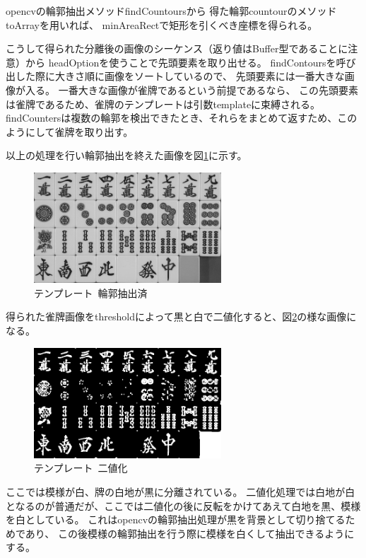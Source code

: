 \documentclass{jsarticle}
\begin{document}
\begin{multicols}{2}
opencvの輪郭抽出メソッドfindCountoursから
得た輪郭countourのメソッドtoArrayを用いれば、
minAreaRectで矩形を引くべき座標を得られる。

こうして得られた分離後の画像のシーケンス（返り値はBuffer型であることに注意）から
headOptionを使うことで先頭要素を取り出せる。
findContoursを呼び出した際に大きさ順に画像をソートしているので、
先頭要素には一番大きな画像が入る。
一番大きな画像が雀牌であるという前提であるなら、
この先頭要素は雀牌であるため、雀牌のテンプレートは引数templateに束縛される。
findCountersは複数の輪郭を検出できたとき、それらをまとめて返すため、このようにして雀牌を取り出す。

以上の処理を行い輪郭抽出を終えた画像を図\ref{fig:templateCrop}に示す。

\begin{figure}[H]
  \begin{center}
    \includegraphics[clip,width=7.0cm]{./img/template_crop.png}
    \caption{テンプレート\ 輪郭抽出済}
    \label{fig:templateCrop}
  \end{center}
\end{figure}

得られた雀牌画像をthresholdによって黒と白で二値化すると、図\ref{fig:templateBinary}の様な画像になる。

\begin{figure}[H]
  \begin{center}
    \includegraphics[clip,width=7.0cm]{./img/template_binary.png}
    \caption{テンプレート\ 二値化}
    \label{fig:templateBinary}
  \end{center}
\end{figure}

ここでは模様が白、牌の白地が黒に分離されている。
二値化処理では白地が白となるのが普通だが、ここでは二値化の後に反転をかけてあえて白地を黒、模様を白としている。
これはopencvの輪郭抽出処理が黒を背景として切り捨てるため\cite{contoursDoc}であり、
この後模様の輪郭抽出を行う際に模様を白くして抽出できるようにする。


\end{multicols}
\end{document}
